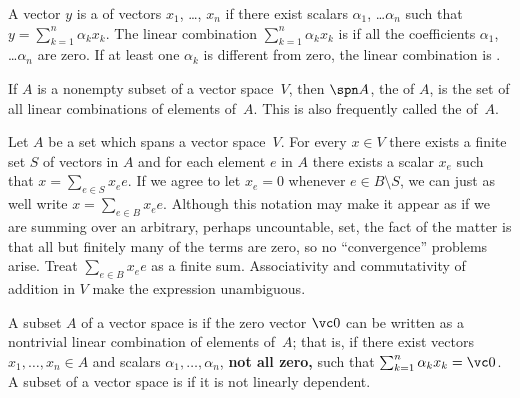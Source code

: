 \begin{defn} A vector $y$ is a
 of vectors $x_1$, \dots, $x_n$ if there exist scalars $\alpha_1$,
\dots $\alpha_n$ such that $y = \sum_{k=1}^n \alpha_k x_k$. The linear combination $\sum_{k=1}^n \alpha_k x_k$ is
 if all the coefficients $\alpha_1$, \dots $\alpha_n$ are zero.  If at least
one $\alpha_k$ is different from zero, the linear combination is .
\end{defn}

\begin{defn} If $A$ is a nonempty subset of a vector space~$V$, then $\spn A$, the
 of $A$, is the set of all linear combinations of elements of~$A$.  This is also frequently called the
 of~$A$.
\end{defn}

\begin{notn}\label{bases111} Let $A$ be a set which spans a vector space~$V$.  For every
$x \in V$ there exists a finite set $S$ of vectors in $A$ and for each element $e$ in $A$
there exists a scalar $x_e$ such that $x = \sum_{e \in S} x_e e$.  If we agree to let $x_e = 0$
whenever $e \in B \setminus S$, we can just as well write $x = \sum_{e \in B} x_e e$.  Although
this notation may make it appear as if we are summing over an arbitrary, perhaps uncountable,
set, the fact of the matter is that all but finitely many of the terms are zero, so no
``convergence'' problems arise. Treat $\sum_{e \in B} x_e e$ as a finite sum.
Associativity and commutativity of addition in $V$ make the expression unambiguous.
\end{notn}

\begin{defn}\label{defn_lin_dep} A subset $A$ of a vector space is
 if the zero vector $\vc 0$ can be written as a nontrivial linear
combination of elements of~$A$; that is, if there exist vectors $x_1, \dots, x_n \in A$
and scalars $\alpha_1, \dots, \alpha_n$, \textbf{not all zero,} such that $\sum_{k=1}^n
\alpha_kx_k = \vc 0$. A subset of a vector space is
 if it is not linearly dependent.
\end{defn}

